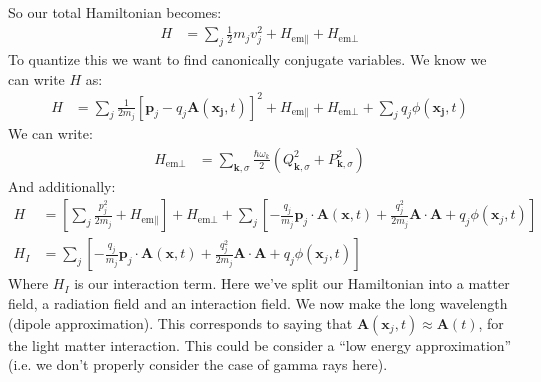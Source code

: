 So our total Hamiltonian becomes:
\begin{align*}
	H &= \sum_j \frac{1}{2}m_j v_j^2 + H_{\text{em}\parallel} + H_{\text{em}\perp}
\end{align*}
To quantize this we want to find canonically conjugate variables. We know we can write $H$ as:
\begin{align*}
	H &= \sum_j \frac{1}{2m_j} \left[\bm{p}_j - q_j \bm{A}(\bm{x_j},t)\right]^2 + H_{\text{em}\parallel} + H_{\text{em}\perp} + \sum_j q_j \phi(\bm{x_j},t)
\end{align*}
We can write:
\begin{align*}
	H_{\text{em}\perp} &= \sum_{\bm{k},\sigma} \frac{\hbar\omega_k}{2} (Q^2_{\bm{k},\sigma} + P_{\bm{k},\sigma}^2)
\end{align*}
And additionally:
\begin{align*}
	H &= \left[\sum_j \frac{p_j^2}{2m_j} + H_{\text{em}\parallel}\right] + H_{\text{em}\perp} + \sum_j \left[-\frac{q_j}{m_j} \bm{p}_j\cdot\bm{A}(\bm{x},t) + \frac{q^2_j}{2m_j} \bm{A}\cdot\bm{A} + q_j \phi(\bm{x}_j,t)\right] \\
	H_I &= \sum_j \left[-\frac{q_j}{m_j} \bm{p}_j\cdot\bm{A}(\bm{x},t) + \frac{q^2_j}{2m_j} \bm{A}\cdot\bm{A} + q_j \phi(\bm{x}_j,t)\right]
\end{align*}
Where $H_I$ is our interaction term. Here we've split our Hamiltonian into a matter field, a radiation field and an interaction field. We now make the long wavelength (dipole approximation).
This corresponds to saying that $\bm{A}(\bm{x}_j,t) \approx \bm{A}(t)$, for the light matter interaction. This could be consider a ``low energy approximation'' (i.e. we don't properly consider the case of gamma rays here).

